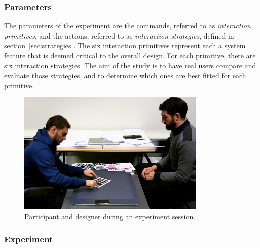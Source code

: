 \subsubsection{Parameters}

The parameters of the experiment are the commands, referred to as \emph{interaction primitives}, and the actions, referred to as \emph{interaction strategies}, defined in section~\ref{sec:strategies}.
The six interaction primitives represent each a system feature that is deemed critical to the overall design.
For each primitive, there are six interaction strategies.
The aim of the study is to have real users compare and evaluate those strategies, and to determine which ones are best fitted for each primitive.

\begin{figure}[htb]
  \centering
    \includegraphics[width=0.8\textwidth]{images/studyScreenshot}
  \caption{Participant and designer during an experiment session.}
  \label{studyScreenshot}
\end{figure}

\subsubsection{Experiment}

